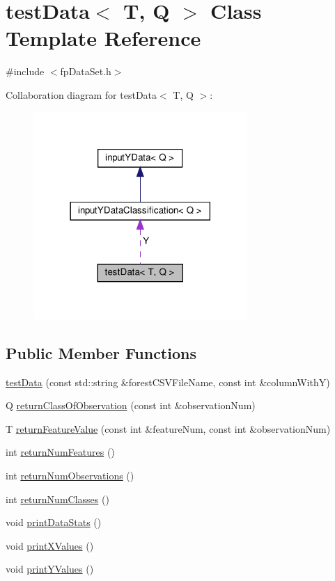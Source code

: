 \hypertarget{classtestData}{}\section{test\+Data$<$ T, Q $>$ Class Template Reference}
\label{classtestData}


{\ttfamily \#include $<$fp\+Data\+Set.\+h$>$}



Collaboration diagram for test\+Data$<$ T, Q $>$\+:\nopagebreak
\begin{figure}[H]
\begin{center}
\leavevmode
\includegraphics[width=230pt]{classtestData__coll__graph}
\end{center}
\end{figure}
\subsection*{Public Member Functions}
\begin{DoxyCompactItemize}
\item 
\hyperlink{classtestData_ad327e412899d5f05b97d4f84ea21efb3}{test\+Data} (const std\+::string \&forest\+C\+S\+V\+File\+Name, const int \&column\+WithY)
\item 
Q \hyperlink{classtestData_a32ce8f625023ea9a9c0a7aff224c75cc}{return\+Class\+Of\+Observation} (const int \&observation\+Num)
\item 
T \hyperlink{classtestData_aec2686210c4776df10cc0658133ed4ad}{return\+Feature\+Value} (const int \&feature\+Num, const int \&observation\+Num)
\item 
int \hyperlink{classtestData_a5ccc979935f93a18f7a35977a7715dbe}{return\+Num\+Features} ()
\item 
int \hyperlink{classtestData_a7b7ea4d5b03144b691e909730d70ce62}{return\+Num\+Observations} ()
\item 
int \hyperlink{classtestData_a002c37538a2877f8c493b9a27e710be7}{return\+Num\+Classes} ()
\item 
void \hyperlink{classtestData_a4c7ffb7eba48e534923d2701437af5e3}{print\+Data\+Stats} ()
\item 
void \hyperlink{classtestData_a56a646213b9d3edfeb8d97461c387437}{print\+X\+Values} ()
\item 
void \hyperlink{classtestData_a7141bf93c921a9f7ca4d47f890458123}{print\+Y\+Values} ()
\end{DoxyCompactItemize}

